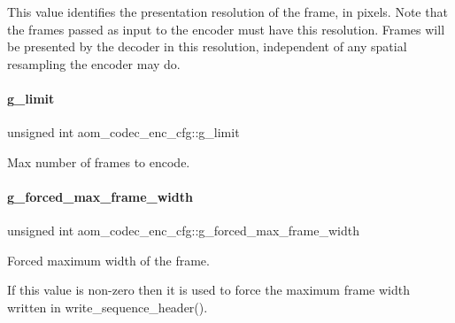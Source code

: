 This value identifies the presentation resolution of the frame, in pixels. Note that the frames passed as input to the encoder must have this resolution. Frames will be presented by the decoder in this resolution, independent of any spatial resampling the encoder may do. \mbox{\label{structaom__codec__enc__cfg_a71628d182062afe21a884fa584714b74}} 
\paragraph{\texorpdfstring{g\+\_\+limit}{g\_limit}}
{\footnotesize\ttfamily unsigned int aom\+\_\+codec\+\_\+enc\+\_\+cfg\+::g\+\_\+limit}



Max number of frames to encode. 

\mbox{\label{structaom__codec__enc__cfg_a8349dcee2119c7fb3fd15a0ae6fdcf12}} 
\paragraph{\texorpdfstring{g\+\_\+forced\+\_\+max\+\_\+frame\+\_\+width}{g\_forced\_max\_frame\_width}}
{\footnotesize\ttfamily unsigned int aom\+\_\+codec\+\_\+enc\+\_\+cfg\+::g\+\_\+forced\+\_\+max\+\_\+frame\+\_\+width}



Forced maximum width of the frame. 

If this value is non-\/zero then it is used to force the maximum frame width written in write\+\_\+sequence\+\_\+header(). \mbox{\label{structaom__codec__enc__cfg_a0a02763f4709e7ed87dfa84532d7eaaf}} 
